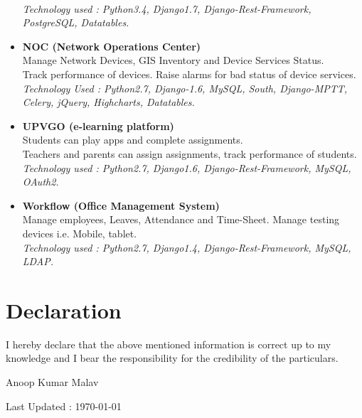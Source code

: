 \documentclass[11pt]{article}
\begin{document}
\begin{itemize}
    \\ \textit{Technology used : Python3.4, Django1.7, Django-Rest-Framework, PostgreSQL, Datatables.}
 \item \textbf{NOC (Network Operations Center)}
    \\ Manage Network Devices, GIS Inventory and Device Services Status.
    \\ Track performance of devices. Raise alarms for bad status of device services.
    \\ \textit{Technology Used : Python2.7, Django-1.6, MySQL, South, Django-MPTT, Celery, jQuery, Highcharts, Datatables.}
 \item \textbf{UPVGO (e-learning platform)}
    \\ Students can play apps and complete assignments.
    \\ Teachers and parents can assign assignments, track performance of students.
    \\ \textit{Technology used : Python2.7, Django1.6, Django-Rest-Framework, MySQL, OAuth2.}
 \item \textbf{Workflow (Office Management System)}
    \\ Manage employees, Leaves, Attendance and Time-Sheet. Manage testing devices i.e. Mobile, tablet.
    \\ \textit{Technology used : Python2.7, Django1.4, Django-Rest-Framework, MySQL, LDAP.}
\end{itemize}


\section*{Declaration}
I hereby declare that the above mentioned information is correct up to
my knowledge and I bear the responsibility for the credibility of the particulars.\\
\begin{flushright}
 Anoop Kumar Malav
\end{flushright}
\begin{center}

Last Updated : \today

\end{center}
\end{document}
